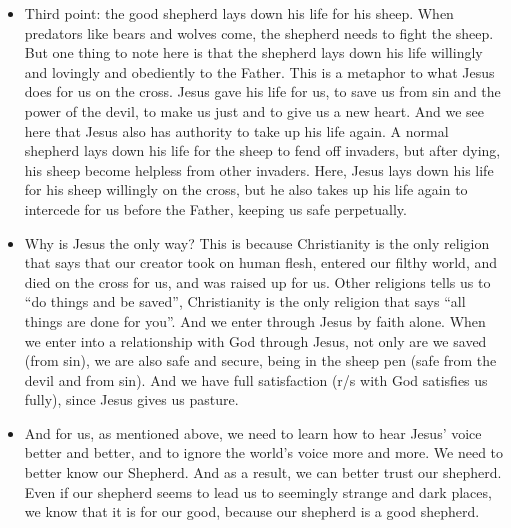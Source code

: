 \begin{itemize}
  \item{Third point: the good shepherd lays down his life for his sheep. When predators like bears and wolves come, the shepherd needs to fight the sheep. But one thing to note here is that the shepherd lays down his life willingly and lovingly and obediently to the Father. This is a metaphor to what Jesus does for us on the cross. Jesus gave his life for us, to save us from sin and the power of the devil, to make us just and to give us a new heart. And we see here that Jesus also has authority to take up his life again. A normal shepherd lays down his life for the sheep to fend off invaders, but after dying, his sheep become helpless from other invaders. Here, Jesus lays down his life for his sheep willingly on the cross, but he also takes up his life again to intercede for us before the Father, keeping us safe perpetually.}
  \item{Why is Jesus the only way? This is because Christianity is the only religion that says that our creator took on human flesh, entered our filthy world, and died on the cross for us, and was raised up for us. Other religions tells us to “do things and be saved”, Christianity is the only religion that says “all things are done for you”. And we enter through Jesus by faith alone. When we enter into a relationship with God through Jesus, not only are we saved (from sin), we are also safe and secure, being in the sheep pen (safe from the devil and from sin). And we have full satisfaction (r/s with God satisfies us fully), since Jesus gives us pasture.}
  \item{And for us, as mentioned above, we need to learn how to hear Jesus’ voice better and better, and to ignore the world’s voice more and more. We need to better know our Shepherd. And as a result, we can better trust our shepherd. Even if our shepherd seems to lead us to seemingly strange and dark places, we know that it is for our good, because our shepherd is a good shepherd. }
\end{itemize}